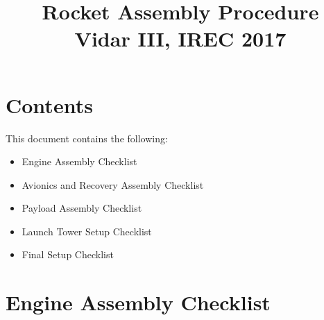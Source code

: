 

\usepackage{gensymb}
\usepackage{hyperref}

\title{
\Huge Rocket Assembly Procedure\\
\vspace{1cm}
\Large Vidar III, IREC 2017}





\section{Contents}
This document contains the following:
\begin{itemize}
    \item Engine Assembly Checklist
    \item Avionics and Recovery Assembly Checklist
    \item Payload Assembly Checklist
    \item Launch Tower Setup Checklist
    \item Final Setup Checklist
\end{itemize}

\section{Engine Assembly Checklist}

